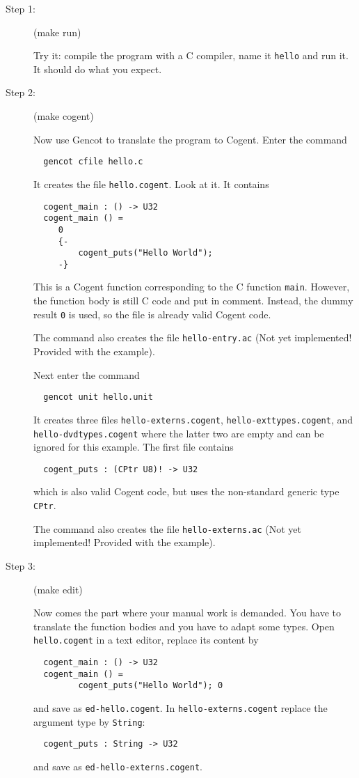 \documentclass[a4paper]{report}
\newcommand{\code}[1]{\textnormal{\texttt{#1}}}
\begin{document}
\begin{description}
\item[Step 1:] (make run)

Try it: compile the program with a C compiler, name it \code{hello} and run it. It should do what you expect.

\item[Step 2:] (make cogent)

Now use Gencot to translate the program to Cogent. Enter the command
\begin{verbatim}
  gencot cfile hello.c
\end{verbatim}
It creates the file \code{hello.cogent}. Look at it. It contains
\begin{verbatim}
  cogent_main : () -> U32
  cogent_main () =
     0
     {-
         cogent_puts("Hello World");
     -}
\end{verbatim}
This is a Cogent function corresponding to the C function \code{main}. However, the function body is still C code
and put in comment. Instead, the dummy result \code{0} is used, so the file is already valid Cogent code.

The command also creates the file \code{hello-entry.ac} (Not yet implemented! Provided with the example).

Next enter the command
\begin{verbatim}
  gencot unit hello.unit
\end{verbatim}
It creates three files \code{hello-externs.cogent}, \code{hello-exttypes.cogent}, and \code{hello-dvdtypes.cogent}
where the latter two are empty and can be ignored for this example. The first file contains
\begin{verbatim}
  cogent_puts : (CPtr U8)! -> U32
\end{verbatim}
which is also valid Cogent code, but uses the non-standard generic type \code{CPtr}. 

The command also creates the file \code{hello-externs.ac} (Not yet implemented! Provided with the example).

\item[Step 3:] (make edit)

Now comes the part where your manual work is demanded. You have to translate the function bodies and you have to adapt
some types. Open \code{hello.cogent} in a text editor, replace its content by
\begin{verbatim}
  cogent_main : () -> U32
  cogent_main () =
         cogent_puts("Hello World"); 0
\end{verbatim}
and save as \code{ed-hello.cogent}. In \code{hello-externs.cogent} replace the argument type by \code{String}:
\begin{verbatim}
  cogent_puts : String -> U32
\end{verbatim}
and save as \code{ed-hello-externs.cogent}.


\end{description}
\end{document}
